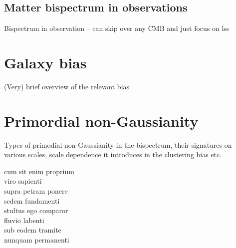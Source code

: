 \subsection{Matter bispectrum in observations}

Bispectrum in observation -- can skip over any CMB and just focus on lss

\section{Galaxy bias}
\label{section:galaxybias}


(Very) brief overview of the relevant bias


\section{Primordial non-Gaussianity}

Types of primodial non-Gaussianity in the bispectrum, their signatures on various scales, scale dependence it introduces in the clustering bias etc. 


cum sit enim proprium \\
viro sapienti \\
supra petram ponere \\
sedem fundamenti \\
stultus ego comparor \\
fluvio labenti \\
sub eodem tramite \\
nunquam permanenti 